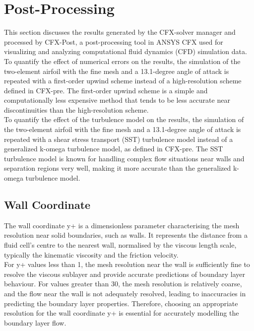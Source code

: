 \section{Post-Processing}
This section discusses the results generated by the CFX-solver manager and processed by CFX-Post, a post-processing tool in ANSYS CFX used for visualizing and analyzing computational fluid dynamics (CFD) simulation data.\\

To quantify the effect of numerical errors on the results, the simulation of the two-element airfoil with the fine mesh and a 13.1-degree angle of attack is repeated with a first-order upwind scheme instead of a high-resolution scheme defined in CFX-pre. The first-order upwind scheme is a simple and computationally less expensive method that tends to be less accurate near discontinuities than the high-resolution scheme.\\

To quantify the effect of the turbulence model on the results, the simulation of the two-element airfoil with the fine mesh and a 13.1-degree angle of attack is repeated with a shear stress transport (SST) turbulence model instead of a generalized k-omega turbulence model, as defined in CFX-pre. The SST turbulence model is known for handling complex flow situations near walls and separation regions very well, making it more accurate than the generalized k-omega turbulence model.





\subsection{Wall Coordinate}
The wall coordinate y+ is a dimensionless parameter characterising the mesh resolution near solid boundaries, such as walls. It represents the distance from a fluid cell's centre to the nearest wall, normalised by the viscous length scale, typically the kinematic viscosity and the friction velocity. \\

For y+ values less than 1, the mesh resolution near the wall is sufficiently fine to resolve the viscous sublayer and provide accurate predictions of boundary layer behaviour. For values greater than 30, the mesh resolution is relatively coarse, and the flow near the wall is not adequately resolved, leading to inaccuracies in predicting the boundary layer properties. Therefore, choosing an appropriate resolution for the wall coordinate y+ is essential for accurately modelling the boundary layer flow. \\

